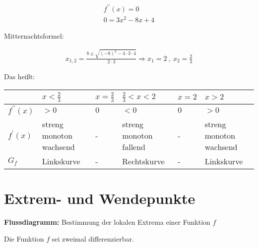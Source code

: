 \begin{equation*}
    \begin{gathered}
        f^{\prime\prime}(x) = 0 \\
        0 = 3x^2-8x + 4
    \end{gathered}
\end{equation*}

Mitternachtsformel:

\begin{equation*}
    \begin{gathered}
        x_{1,2}=\frac{8\pm\sqrt{(-8)^2-4\cdot3\cdot4}}{2\cdot3} \Rightarrow x_1 = 2 \ , \ x_2 = \frac{2}{3}
    \end{gathered}
\end{equation*}

Das heißt: 

\begin{tabularx}{\textwidth} { 
  | >{\raggedright\arraybackslash}X 
  | >{\centering\arraybackslash}X
  | >{\centering\arraybackslash}X
  | >{\centering\arraybackslash}X
  | >{\centering\arraybackslash}X
  | >{\centering\arraybackslash}X | }
 \hline
  & $x < \frac{2}{3}$ & $x = \frac{2}{3}$ & $\frac{2}{3} < x < 2$ & $x = 2$ & $x > 2$ \\
 \hline
 $f^{\prime\prime}(x)$  & $>0$ & $0$ & $<0$ & $0$ & $>0$  \\
 \hline
 $f^{\prime}(x)$ & streng monoton wachsend & - & streng monoton fallend & - & streng monoton wachsend \\
 \hline
 $G_f$ & Linkskurve & - & Rechtskurve & - & Linkskurve \\
\hline
\end{tabularx}

\section{Extrem- und Wendepunkte}
\textbf{Flussdiagramm:} Bestimmung der lokalen Extrema einer Funktion $f$

Die Funktion $f$ sei zweimal differenzierbar.\\

